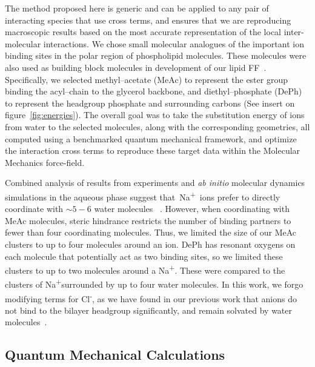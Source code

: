 \documentclass[12pt,openany,final]{book}
\newcommand{\na}{Na\textsuperscript{+}}
\newcommand{\cl}{Cl\textsuperscript{-}}
\begin{document}
The method proposed here is generic and can be applied to any pair of
interacting species that use cross terms, and ensures that we are
reproducing macroscopic results based on the most accurate
representation of the local inter-molecular interactions.  We chose
small molecular analogues of the important ion binding
sites in the polar region of phospholipid
molecules. These molecules were also used as building block molecules in development of our lipid
FF~\cite{kruczek:2017,chiu:2009}. Specifically, we selected
methyl--acetate (MeAc) to represent the ester group binding the
acyl--chain to the glycerol backbone, and diethyl--phosphate (DePh) to
represent the headgroup phosphate and surrounding carbons (See insert on figure~\ref{fig:energies}). 
The overall goal was to take the substitution energy of ions from
water to the selected molecules, along with the corresponding
geometries, all computed using a benchmarked quantum mechanical framework, 
and optimize the interaction cross terms to reproduce these target data 
within the Molecular Mechanics force-field.

Combined analysis of results from experiments and \emph{ab initio} molecular dynamics simulations
in the aqueous phase suggest that~\na~ions prefer to directly coordinate 
with $\sim 5-6$ water molecules~
\cite{varma:2006:coordination,mason:2006:neutron,galib:2017:revisiting,timko:2010:dissociation,smirnov:2020}.
However, when coordinating with MeAc molecules, steric hindrance restricts the 
number of binding partners to fewer than four coordinating molecules.  
Thus, we limited the size of our MeAc clusters to up to four molecules around an ion. 
DePh has resonant oxygens on each molecule that potentially act as two binding sites, so we
limited these clusters to up to two molecules around a \na. These were
compared to the clusters of \na surrounded by up to four water
molecules.
In this work, we forgo modifying terms for \cl, as we have found in our previous work 
that anions do not bind to the bilayer headgroup significantly, and remain solvated 
by water molecules~\cite{kruczek:2017}.

\subsection{Quantum Mechanical Calculations}
\end{document}
